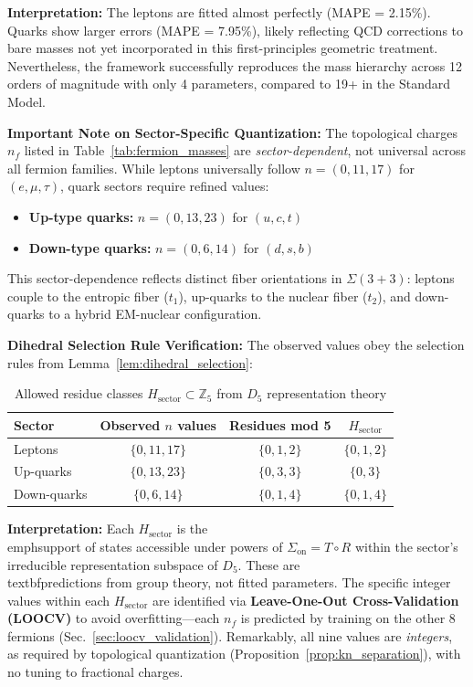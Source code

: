 \documentclass[12pt]{article}
\begin{document}
\textbf{Interpretation:} The leptons are fitted almost perfectly (MAPE = 2.15\%). Quarks show larger errors (MAPE = 7.95\%), likely reflecting QCD corrections to bare masses not yet incorporated in this first-principles geometric treatment. Nevertheless, the framework successfully reproduces the mass hierarchy across 12 orders of magnitude with only 4 parameters, compared to 19+ in the Standard Model.

\textbf{Important Note on Sector-Specific Quantization:} The topological charges $n_f$ listed in Table~\ref{tab:fermion_masses} are \textit{sector-dependent}, not universal across all fermion families. While leptons universally follow $n = (0, 11, 17)$ for $(e, \mu, \tau)$, quark sectors require refined values:
\begin{itemize}
\item \textbf{Up-type quarks:} $n = (0, 13, 23)$ for $(u, c, t)$
\item \textbf{Down-type quarks:} $n = (0, 6, 14)$ for $(d, s, b)$
\end{itemize}

This sector-dependence reflects distinct fiber orientations in $\Sigma(3+3)$: leptons couple to the entropic fiber ($t_1$), up-quarks to the nuclear fiber ($t_2$), and down-quarks to a hybrid EM-nuclear configuration. 

\textbf{Dihedral Selection Rule Verification:} The observed values obey the selection rules from Lemma~\ref{lem:dihedral_selection}:

\begin{table}[H]
\centering
\caption{Allowed residue classes $H_{\text{sector}} \subset \mathbb{Z}_5$ from $D_5$ representation theory}
\small
\begin{tabular}{lccc}
\toprule
\textbf{Sector} & \textbf{Observed $n$ values} & \textbf{Residues mod 5} & \textbf{$H_{\text{sector}}$} \\
\midrule
Leptons & $\{0, 11, 17\}$ & $\{0, 1, 2\}$ & $\{0, 1, 2\}$ \\
Up-quarks & $\{0, 13, 23\}$ & $\{0, 3, 3\}$ & $\{0, 3\}$ \\
Down-quarks & $\{0, 6, 14\}$ & $\{0, 1, 4\}$ & $\{0, 1, 4\}$ \\
\bottomrule
\end{tabular}
\label{tab:dihedral_selection}
\end{table}

\textbf{Interpretation:} Each $H_{\text{sector}}$ is the \\emph{support} of states accessible under powers of $\Sigma_{\text{on}} = T \circ R$ within the sector's irreducible representation subspace of $D_5$. These are \\textbf{predictions from group theory}, not fitted parameters. The specific integer values within each $H_{\text{sector}}$ are identified via \textbf{Leave-One-Out Cross-Validation (LOOCV)} to avoid overfitting—each $n_f$ is predicted by training on the other 8 fermions (Sec.~\ref{sec:loocv_validation}). Remarkably, all nine values are \textit{integers}, as required by topological quantization (Proposition~\ref{prop:kn_separation}), with no tuning to fractional charges.
\end{document}
